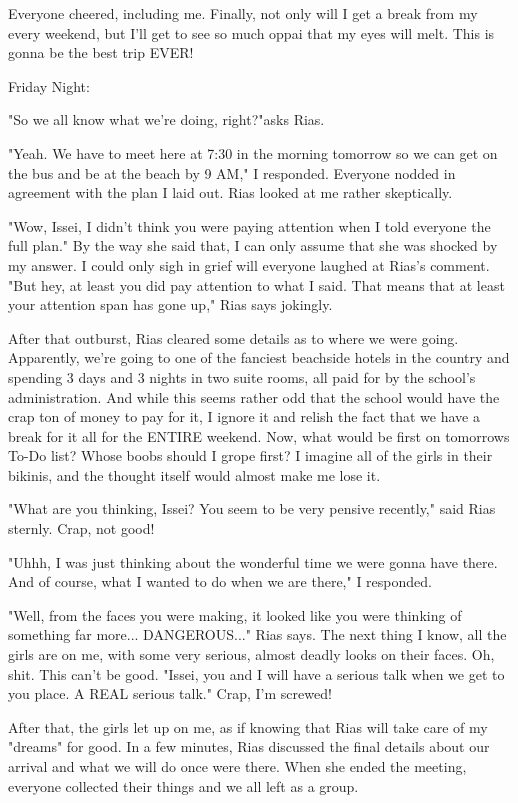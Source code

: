 \documentclass{article}
\begin{document}
Everyone cheered, including me. Finally, not only will I get a break from my every weekend, but I'll get to see so much oppai that my eyes will melt. This is gonna be the best trip EVER!

Friday Night:

"So we all know what we're doing, right?"asks Rias.

"Yeah. We have to meet here at 7:30 in the morning tomorrow so we can get on the bus and be at the beach by 9 AM," I responded. Everyone nodded in agreement with the plan I laid out. Rias looked at me rather skeptically.

"Wow, Issei, I didn't think you were paying attention when I told everyone the full plan." By the way she said that, I can only assume that she was shocked by my answer. I could only sigh in grief will everyone laughed at Rias's comment. "But hey, at least you did pay attention to what I said. That means that at least your attention span has gone up," Rias says jokingly.

After that outburst, Rias cleared some details as to where we were going. Apparently, we're going to one of the fanciest beachside hotels in the country and spending 3 days and 3 nights in two suite rooms, all paid for by the school's administration. And while this seems rather odd that the school would have the crap ton of money to pay for it, I ignore it and relish the fact that we have a break for it all for the ENTIRE weekend. Now, what would be first on tomorrows To-Do list? Whose boobs should I grope first? I imagine all of the girls in their bikinis, and the thought itself would almost make me lose it.

"What are you thinking, Issei? You seem to be very pensive recently," said Rias sternly. Crap, not good!

"Uhhh, I was just thinking about the wonderful time we were gonna have there. And of course, what I wanted to do when we are there," I responded.

"Well, from the faces you were making, it looked like you were thinking of something far more... DANGEROUS..." Rias says. The next thing I know, all the girls are on me, with some very serious, almost deadly looks on their faces. Oh, shit. This can't be good. "Issei, you and I will have a serious talk when we get to you place. A REAL serious talk." Crap, I'm screwed!

After that, the girls let up on me, as if knowing that Rias will take care of my "dreams" for good. In a few minutes, Rias discussed the final details about our arrival and what we will do once were there. When she ended the meeting, everyone collected their things and we all left as a group.
\end{document}
